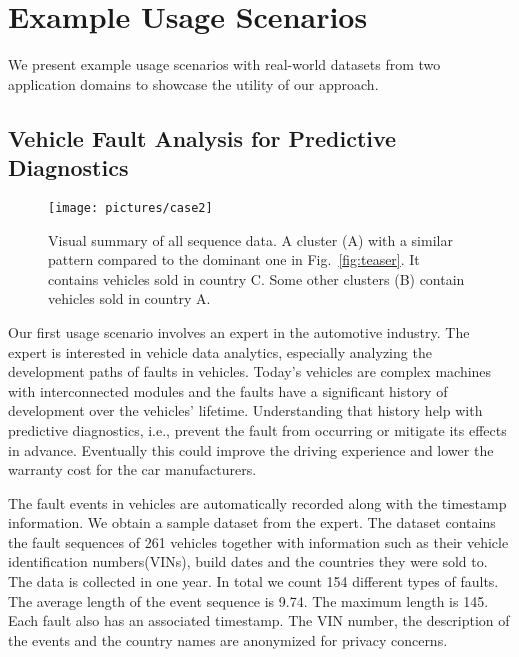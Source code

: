 \section{Example Usage Scenarios}
\label{section:case}

We present example usage scenarios with real-world datasets from two application domains to showcase the utility of our approach. 

\subsection{Vehicle Fault Analysis for Predictive Diagnostics}

\begin{figure}[h]
	\centering
	\texttt{[image: pictures/case2]}
	\caption{Visual summary of all sequence data. A cluster (A) with a similar pattern compared to the dominant one in Fig.~\ref{fig:teaser}. It contains vehicles sold in country C. Some other clusters (B) contain vehicles sold in country A.}
	\label{fig:case0_2}
\end{figure}

Our first usage scenario involves an expert in the automotive industry. The expert is interested in vehicle data analytics, especially analyzing the development paths of faults in vehicles.  Today's vehicles are complex machines with interconnected modules and the faults have a significant history of development over the vehicles' lifetime. Understanding that history help with predictive diagnostics, i.e., prevent the fault from occurring or mitigate its effects in advance. Eventually this could improve the driving experience and lower the warranty cost for the car manufacturers.

The fault events in vehicles are automatically recorded along with the timestamp information. We obtain a sample dataset  from the expert. The dataset contains the fault sequences of 261 vehicles together with information such as their vehicle identification numbers(VINs), build dates and the countries they were sold to. The data is collected in one year. In total we count 154 different types of faults. The average length of the event sequence is 9.74. The maximum length is 145. Each fault also has an associated timestamp. The VIN number, the description of the events and the country names are anonymized for privacy concerns.

